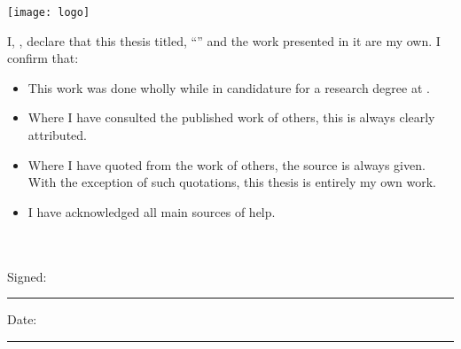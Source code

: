 \documentclass[
12pt, %
oneside, %
english, %
doublespacing, %
doublespacing, %
toctotoc, %
parskip, %
headsepline, %
]{MastersDoctoralThesis} %
\begin{document}
\begin{titlepage}
\begin{center}
\renewcommand\floatpagefraction{0.1}

\texttt{[image: logo]} %


\end{center}
\end{titlepage}


\begin{declaration}
\addchaptertocentry{\authorshipname} %
\noindent I, \authorname, declare that this thesis titled, \enquote{\ttitle} and the work presented in it are my own. I confirm that:

\begin{itemize} 
\item This work was done wholly while in candidature for a research degree at \univname.
\item Where I have consulted the published work of others, this is always clearly attributed.
\item Where I have quoted from the work of others, the source is always given. With the exception of such quotations, this thesis is entirely my own work.
\item I have acknowledged all main sources of help.
\end{itemize}
 ~\\
 ~\\
\noindent Signed:\\
\rule[0.5em]{25em}{0.5pt} %
 
\noindent Date:\\
\rule[0.5em]{25em}{0.5pt} %
\end{declaration}
\end{document}
